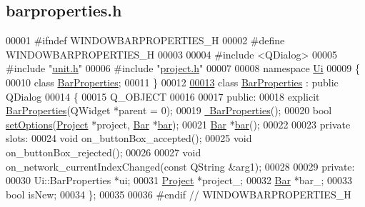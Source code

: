 \hypertarget{barproperties_8h_source}{}\subsection{barproperties.\+h}
\label{barproperties_8h_source}

\begin{DoxyCode}
00001 \textcolor{preprocessor}{#ifndef WINDOWBARPROPERTIES\_H}
00002 \textcolor{preprocessor}{#define WINDOWBARPROPERTIES\_H}
00003 
00004 \textcolor{preprocessor}{#include <QDialog>}
00005 \textcolor{preprocessor}{#include "\hyperlink{unit_8h}{unit.h}"}
00006 \textcolor{preprocessor}{#include "\hyperlink{project_8h}{project.h}"}
00007 
00008 \textcolor{keyword}{namespace }\hyperlink{namespace_ui}{Ui}
00009 \{
00010 \textcolor{keyword}{class }\hyperlink{class_bar_properties}{BarProperties};
00011 \}
00012 
\hypertarget{barproperties_8h_source_l00013}{}\hyperlink{class_bar_properties}{00013} \textcolor{keyword}{class }\hyperlink{class_bar_properties}{BarProperties} : \textcolor{keyword}{public} QDialog
00014 \{
00015   Q\_OBJECT
00016 
00017 \textcolor{keyword}{public}:
00018   \textcolor{keyword}{explicit} \hyperlink{class_bar_properties_a7c14a54f430cabfe872869799076025b}{BarProperties}(QWidget *parent = 0);
00019   \hyperlink{class_bar_properties_a639b4da849970025a2935ee965d6a465}{~BarProperties}();
00020   \textcolor{keywordtype}{bool} \hyperlink{class_bar_properties_a0a9a2284b5aad8acbade86ccec7adbf8}{setOptions}(\hyperlink{class_project}{Project} *project, \hyperlink{class_bar}{Bar} *\hyperlink{class_bar_properties_a65d09e7315764cd4ad33b5a0ded32090}{bar});
00021   \hyperlink{class_bar}{Bar} *\hyperlink{class_bar_properties_a65d09e7315764cd4ad33b5a0ded32090}{bar}();
00022 
00023 \textcolor{keyword}{private} slots:
00024   \textcolor{keywordtype}{void} on\_buttonBox\_accepted();
00025   \textcolor{keywordtype}{void} on\_buttonBox\_rejected();
00026 
00027   \textcolor{keywordtype}{void} on\_network\_currentIndexChanged(\textcolor{keyword}{const} QString &arg1);
00028   
00029 \textcolor{keyword}{private}:
00030   Ui::BarProperties *ui;
00031   \hyperlink{class_project}{Project} *project\_;
00032   \hyperlink{class_bar}{Bar} *bar\_;
00033   \textcolor{keywordtype}{bool} isNew;
00034 \};
00035 
00036 \textcolor{preprocessor}{#endif // WINDOWBARPROPERTIES\_H}
\end{DoxyCode}
